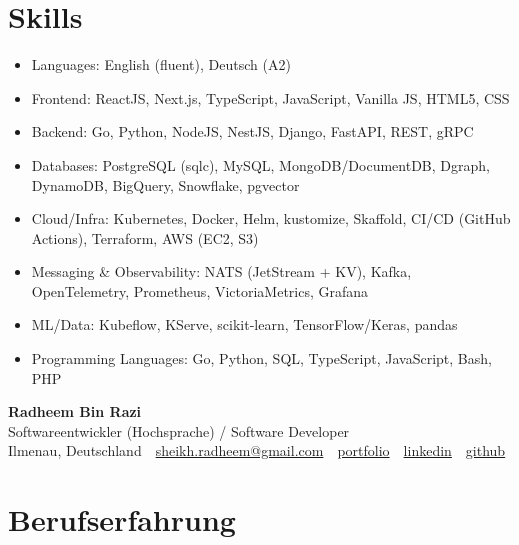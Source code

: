 \documentclass[10pt,a4paper]{resume}
\makeatletter
\newcommand{\Portfolio}{https://radheem.github.io/my-cv}
\newcommand{\PortfolioText}{portfolio}
\newcommand{\GitHub}{https://github.com/radheem}
\newcommand{\LinkedIn}{https://www.linkedin.com/in/radheem-razi}
\newcommand{\Email}{sheikh.radheem@gmail.com}
\makeatother
\begin{document}
\section{Skills}

\begin{itemize}[leftmargin=1.4em,nosep,topsep=2pt]
  \item Languages: English (fluent), Deutsch (A2)
  \item Frontend: ReactJS, Next.js, TypeScript, JavaScript, Vanilla JS, HTML5, CSS
  \item Backend: Go, Python, NodeJS, NestJS, Django, FastAPI, REST, gRPC
  \item Databases: PostgreSQL (sqlc), MySQL, MongoDB/DocumentDB, Dgraph, DynamoDB, BigQuery, Snowflake, pgvector
  \item Cloud/Infra: Kubernetes, Docker, Helm, kustomize, Skaffold, CI/CD (GitHub Actions), Terraform, AWS (EC2, S3)
  \item Messaging \& Observability: NATS (JetStream + KV), Kafka, OpenTelemetry, Prometheus, VictoriaMetrics, Grafana
  \item ML/Data: Kubeflow, KServe, scikit-learn, TensorFlow/Keras, pandas
  \item Programming Languages: Go, Python, SQL, TypeScript, JavaScript, Bash, PHP
\end{itemize}

\clearpage
{}

\begin{center}
  {\huge\bfseries Radheem Bin Razi}\\[3pt]
  {\large Softwareentwickler (Hochsprache) / Software Developer}\\[6pt]
  \small
  Ilmenau, Deutschland \,\textbar\,
  \href{mailto:\Email}{\Email} \,\textbar\,
  \href{\Portfolio}{\PortfolioText} \,\textbar\,
  \href{\LinkedIn}{linkedin} \,\textbar\,
  \href{\GitHub}{github}
\end{center}
\vspace{2pt}

\section{Berufserfahrung}
\end{document}
